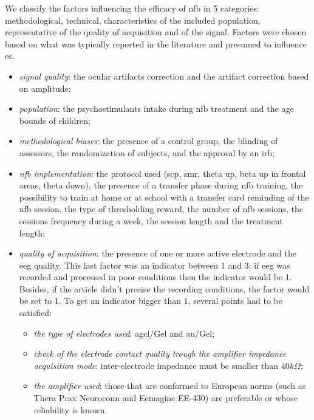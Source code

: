 We classify the factors influencing the efficacy of \gls{nfb} in 5 categories: methodological, technical, characteristics of the included
population, representative of the quality of acquisition and of the signal. 
Factors were chosen based on what was typically reported in the literature and presumed to influence \gls{es}.
\begin{itemize}
\item \emph{signal quality}: the ocular artifacts correction and the artifact correction based on amplitude; 
\item \emph{population}: the psychostimulants intake during \gls{nfb} treatment and the age bounds of children;
\item \emph{methodological biases}: the presence of a control group, the blinding of assessors, 
the randomization of subjects, and the approval by an \gls{irb};
\item \emph{\gls{nfb} implementation}: the protocol used (\gls{scp}, \gls{smr}, 
theta up, beta up in frontal areas, theta down), the presence of a transfer phase during \gls{nfb} training, the possibility to train at home 
or at school with a transfer card reminding of the \gls{nfb} session, 
the type of thresholding reward, the number of \gls{nfb} sessions, the sessions frequency during a week, the session length and the treatment length;
\item \emph{quality of acquisition}: the presence of one or more active electrode and the \gls{eeg} quality. 
This last factor was an indicator between 1 and 3: if \gls{eeg} was recorded and processed in poor conditions then the indicator would be 1. 
Besides, if the article didn't precise the recording conditions, the factor would be set to 1. To get an indicator bigger than 1, several 
points had to be satisfied:
\begin{itemize}
  \item \emph{the type of electrodes used}: \gls{agcl}/Gel and \gls{au}/Gel;
  \item \emph{check of the electrode contact quality trough the amplifier impedance acquisition mode}: inter-electrode impedance must be smaller than $ 40k \Omega$;  
\item \emph{the amplifier used}: those that are conformed to European norms (such as Thera Prax \textregistered 
Neuroconn and Eemagine EE-430) are preferable or whose reliability is known.
\end{itemize}
\end{itemize}

